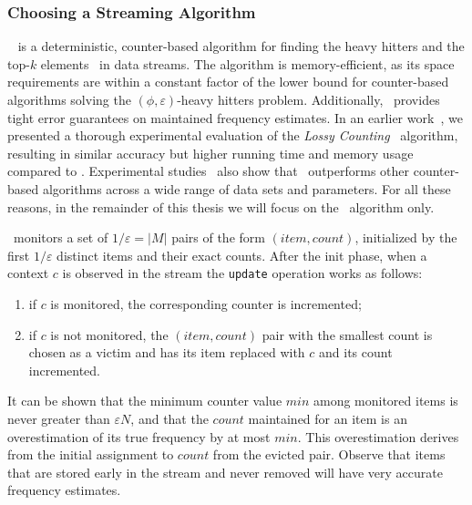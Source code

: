 \subsubsection*{Choosing a Streaming Algorithm}
{\em \spacesaving}~\cite{Metwally06} is a deterministic, counter-based algorithm for finding the heavy hitters and the top-$k$ elements~\cite{Charikar02} in data streams. The algorithm is memory-efficient, as its space requirements are within a constant factor of the lower bound for counter-based algorithms solving the $(\phi,\varepsilon)$-heavy hitters problem. Additionally, \spacesaving\ provides tight error guarantees on maintained frequency estimates. In an earlier work~\cite{Delia11}, we presented a thorough
experimental evaluation of the {\em Lossy Counting}~\cite{Manku02} algorithm, resulting in similar accuracy but higher running time and memory usage compared to \spacesaving. Experimental studies~\cite{Cormode08,Manerikar09} also show that \spacesaving\ outperforms other counter-based algorithms across a wide range of data sets and parameters. For all these reasons, in the remainder of this thesis we will focus on the \spacesaving\ algorithm only.


\spacesaving\ monitors a set of $1/\varepsilon=|M|$ pairs of the form $(item, count)$, initialized by the first $1/\varepsilon$ distinct items and their exact counts. After the init phase, when a context $c$ is observed in the stream the {\tt update} operation works as follows: 

\begin{enumerate}[parsep=0pt,topsep=3pt]
\item if $c$ is monitored, the corresponding counter is incremented; 
\item if $c$ is not monitored, the $(item, count)$ pair with the smallest count is chosen as a victim and has its item replaced with $c$ and its count incremented.
\end{enumerate}

\noindent It can be shown that the minimum counter value $min$ among monitored items is never greater than $\varepsilon N$, and that the $count$ maintained for an item is an overestimation of its true frequency by at most $min$. This overestimation derives from the initial assignment to $count$ from the evicted pair. Observe that items that are stored early in the stream and never removed will have very accurate frequency estimates.

